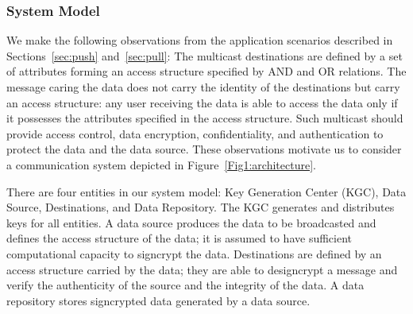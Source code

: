 \documentclass[letterpaper,12pt]{article}
\begin{document}



\subsubsection{System Model}\label{sec:model}

We make the following observations from the application scenarios described in Sections~\ref{sec:push} and~\ref{sec:pull}: The multicast destinations are defined by a set of attributes forming an access structure specified by AND and OR relations. The message caring the data does not carry the identity of the destinations but carry an access structure: any user receiving the data is able to access the data only if it possesses the attributes specified in the access structure. Such multicast should provide access control, data encryption, confidentiality, and authentication to protect the data and the data source. These observations motivate us to consider a communication system depicted in Figure~\ref{Fig1:architecture}.

There are four entities in our system model: Key Generation Center (KGC), Data Source, Destinations, and Data Repository. The KGC generates and distributes keys for all entities. A data source produces the data to be broadcasted and defines the access structure of the data; it is assumed to have sufficient computational capacity to signcrypt the data. Destinations are defined by an access structure carried by the data; they are able to designcrypt a message and verify the authenticity of the source and the integrity of the data. A data repository stores signcrypted data generated by a data source.
\end{document}
